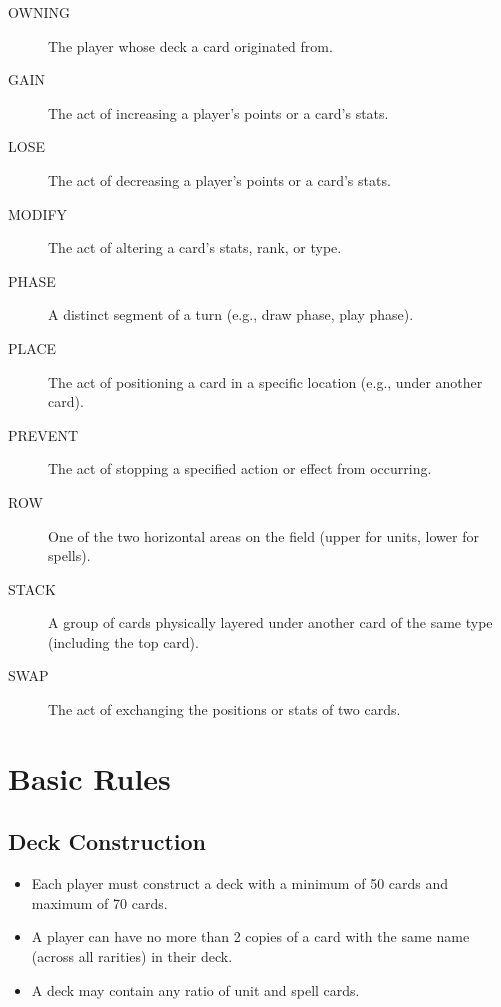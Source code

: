 \begin{description}
    \item[OWNING] The player whose deck a card originated from.
    \item[GAIN] The act of increasing a player’s points or a card’s stats.
    \item[LOSE] The act of decreasing a player’s points or a card’s stats.
    \item[MODIFY] The act of altering a card’s stats, rank, or type.
    \item[PHASE] A distinct segment of a turn (e.g., draw phase, play phase).
    \item[PLACE] The act of positioning a card in a specific location (e.g., under another card).
    \item[PREVENT] The act of stopping a specified action or effect from occurring.
    \item[ROW] One of the two horizontal areas on the field (upper for units, lower for spells).
    \item[STACK] A group of cards physically layered under another card of the same type (including the top card).
    \item[SWAP] The act of exchanging the positions or stats of two cards.
\end{description}











\section{Basic Rules}

\subsection{Deck Construction}
\begin{itemize}
    \item Each player must construct a deck with a minimum of 50 cards and maximum of 70 cards.
    \item A player can have no more than 2 copies of a card with the same name (across all rarities) in their deck.
    \item A deck may contain any ratio of unit and spell cards.
\end{itemize}





